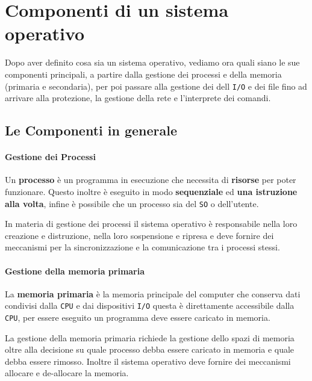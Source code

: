 \chapter{Componenti di un sistema operativo}
\label{chap:componentiSO}

Dopo aver definito cosa sia un sistema operativo, vediamo ora quali siano le sue componenti principali, a partire dalla gestione dei processi e della memoria (primaria e secondaria), per poi passare alla gestione dei dell \texttt{I/O} e dei file fino ad arrivare alla protezione, la gestione della rete e l'interprete dei comandi.

\section{Le Componenti in generale}

    \subsubsection{Gestione dei Processi}
        \begin{definition}[Processo]
            Un \textbf{processo} è un programma in esecuzione che necessita di \textbf{risorse} per poter funzionare. Questo inoltre è eseguito in modo \textbf{sequenziale} ed \textbf{una istruzione alla volta}, infine è possibile che un processo sia del \texttt{SO} o dell'utente.
        \end{definition}
        In materia di gestione dei processi il sistema operativo è responsabile nella loro creazione e distruzione, nella loro sospensione e ripresa e deve fornire dei meccanismi per la sincronizzazione e la comunicazione tra i processi stessi.

    \subsubsection{Gestione della memoria primaria}
        \begin{definition}
            La \textbf{memoria primaria} è la memoria principale del computer che conserva dati condivisi dalla \texttt{CPU} e dai dispositivi \texttt{I/O} questa è direttamente accessibile dalla \texttt{CPU}, per essere eseguito un programma deve essere caricato in memoria.
        \end{definition}
        La gestione della memoria primaria richiede la gestione dello spazi di memoria oltre alla decisione su quale processo debba essere caricato in memoria e quale debba essere rimosso. Inoltre il sistema operativo deve fornire dei meccanismi allocare e de-allocare la memoria.

